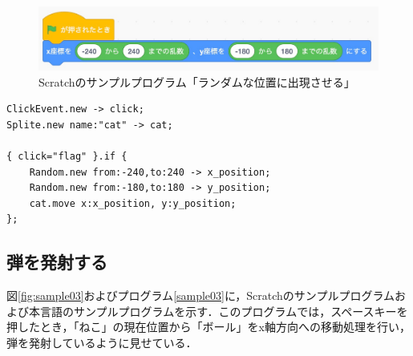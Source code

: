 \documentclass[10pt,a4j]{ltjsarticle}
\begin{document}
\begin{figure}[H]
  \centering
  \includegraphics[scale=0.6]{images/sample01.pdf}
  \caption{Scratchのサンプルプログラム「ランダムな位置に出現させる」}
  \label{fig:sample01}
\end{figure}

\begin{lstlisting}[caption=本言語のサンプルプログラム「ランダムな位置に出現させる」, label=sample01]
ClickEvent.new -> click;
Splite.new name:"cat" -> cat;

{ click="flag" }.if {
    Random.new from:-240,to:240 -> x_position;
    Random.new from:-180,to:180 -> y_position;
    cat.move x:x_position, y:y_position;
};
\end{lstlisting}

\subsection{弾を発射する}
図\ref{fig:sample03}およびプログラム\ref{sample03}に，Scratchのサンプルプログラムおよび本言語のサンプルプログラムを示す．このプログラムでは，スペースキーを押したとき，「ねこ」の現在位置から「ボール」をx軸方向への移動処理を行い，弾を発射しているように見せている．
\end{document}
